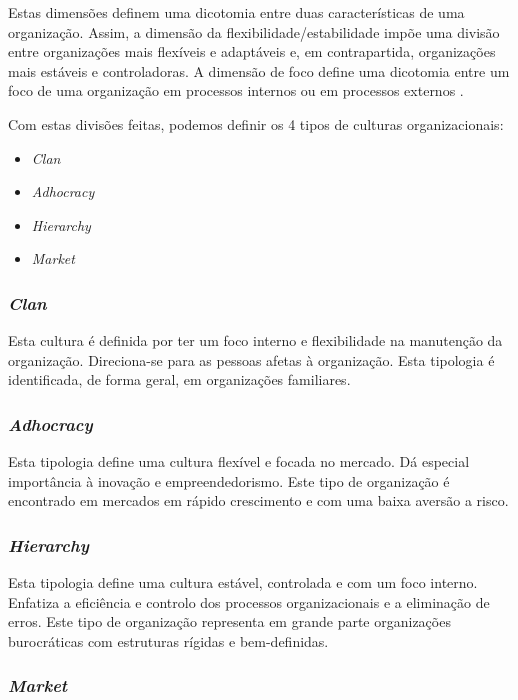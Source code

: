 Estas dimensões definem uma dicotomia entre duas características de uma organização. Assim, a dimensão da flexibilidade/estabilidade impõe uma divisão entre organizações mais flexíveis e adaptáveis e, em contrapartida, organizações mais estáveis e controladoras. A dimensão de foco define uma dicotomia entre um foco de uma organização em processos internos ou em processos externos \parencite{diagnosing}.

Com estas divisões feitas, podemos definir os 4 tipos de culturas organizacionais:

\begin{itemize}
	\item \textit{Clan}
	\item \textit{Adhocracy}
	\item \textit{Hierarchy}
	\item \textit{Market}
\end{itemize}

\subsubsection{\textit{Clan}}

Esta cultura é definida por ter um foco interno e flexibilidade na manutenção da organização. Direciona-se para as pessoas afetas à organização. Esta tipologia é identificada, de forma geral, em organizações familiares.


\subsubsection{\textit{Adhocracy}}

Esta tipologia define uma cultura flexível e focada no mercado. Dá especial importância à inovação e empreendedorismo. Este tipo de organização é encontrado em mercados em rápido crescimento e com uma baixa aversão a risco.

\subsubsection{\textit{Hierarchy}}

Esta tipologia define uma cultura estável, controlada e com um foco interno. Enfatiza a eficiência e controlo dos processos organizacionais e a eliminação de erros. Este tipo de organização representa em grande parte organizações burocráticas com estruturas rígidas e bem-definidas.

\subsubsection{\textit{Market}}

